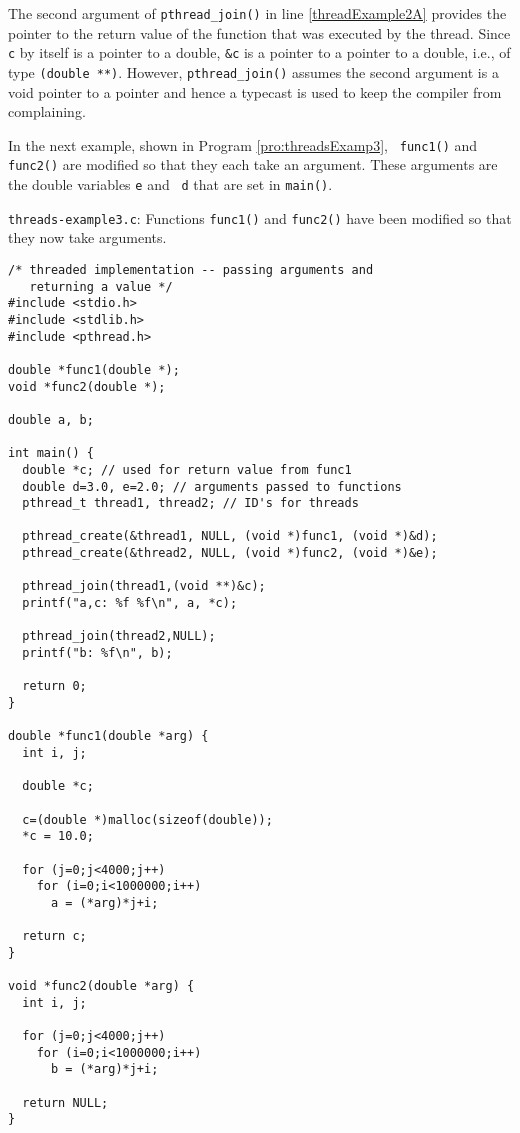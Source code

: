 The second argument of {\tt pthread\_join()} in line
\ref{threadExample2A} provides the pointer to the return value of the
function that was executed by the thread.  Since {\tt c} by itself is
a pointer to a double, {\tt \&c} is a pointer to a pointer to a
double, i.e., of type {\tt (double **)}.  However, {\tt pthread\_join()}
assumes the second argument is a void pointer to a pointer and hence a
typecast is used to keep the compiler from complaining.

In the next example, shown in Program \ref{pro:threadsExamp3}, {\tt
func1()} and {\tt func2()} are modified so that they each take an
argument.  These arguments are the double variables {\tt e} and {\tt
d} that are set in {\tt main()}.

\begin{program}
{\tt threads-example3.c}: Functions {\tt func1()} and {\tt func2()}
have been modified so that they now take arguments.
\label{pro:threadsExamp3}
\codemiddle
\begin{lstlisting}
/* threaded implementation -- passing arguments and 
   returning a value */
#include <stdio.h>
#include <stdlib.h>
#include <pthread.h>

double *func1(double *);
void *func2(double *);

double a, b;

int main() {
  double *c; // used for return value from func1
  double d=3.0, e=2.0; // arguments passed to functions
  pthread_t thread1, thread2; // ID's for threads

  pthread_create(&thread1, NULL, (void *)func1, (void *)&d);
  pthread_create(&thread2, NULL, (void *)func2, (void *)&e);

  pthread_join(thread1,(void **)&c);
  printf("a,c: %f %f\n", a, *c);

  pthread_join(thread2,NULL);
  printf("b: %f\n", b);

  return 0;
}

double *func1(double *arg) {
  int i, j;

  double *c;

  c=(double *)malloc(sizeof(double));
  *c = 10.0;

  for (j=0;j<4000;j++)
    for (i=0;i<1000000;i++)
      a = (*arg)*j+i;

  return c;
}
  
void *func2(double *arg) {
  int i, j;

  for (j=0;j<4000;j++)
    for (i=0;i<1000000;i++)
      b = (*arg)*j+i;

  return NULL;
}
\end{lstlisting}
\end{program}

